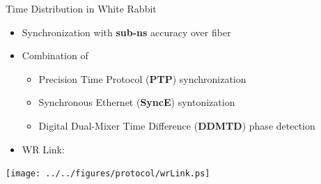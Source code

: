 \documentclass[compress,red]{beamer}
\begin{document}
\begin{frame}{Time Distribution in White Rabbit}

  \begin{itemize}
    \item Synchronization with {\bf sub-ns} accuracy over fiber
    \item Combination of
	\begin{itemize}
	  \item Precision Time Protocol ({\bf PTP}) synchronization
	  \item Synchronous Ethernet ({\bf SyncE}) syntonization
	  \item Digital Dual-Mixer Time Difference ({\bf DDMTD}) phase detection
	\end{itemize}
    \item WR Link:
  \end{itemize}

  \begin{center}
  \texttt{[image: ../../figures/protocol/wrLink.ps]}
  \end{center}

\end{frame}
\end{document}

